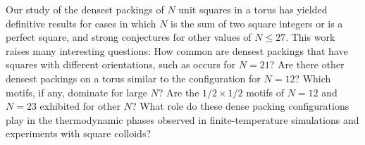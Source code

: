 \documentclass[preprint,aps]{revtex4}
\begin{document}

Our study of the densest packings of $N$ unit squares in a torus has yielded definitive results for cases in which $N$ is the sum of two square integers or is a perfect square, and strong conjectures for other values of $N \le 27$.  This work raises many interesting questions: How common are densest packings that have squares with different orientations, such as occurs for $N=21$?  Are there other densest packings on a torus similar to the configuration for $N=12$?  Which motifs, if any, dominate for large $N$?  Are the $1/2 \times 1/2$ motifs of $N=12$ and $N=23$ exhibited for other $N$? What role do these dense packing configurations play in the thermodynamic phases observed in finite-temperature simulations and experiments with square colloids?


%




\end{document}
